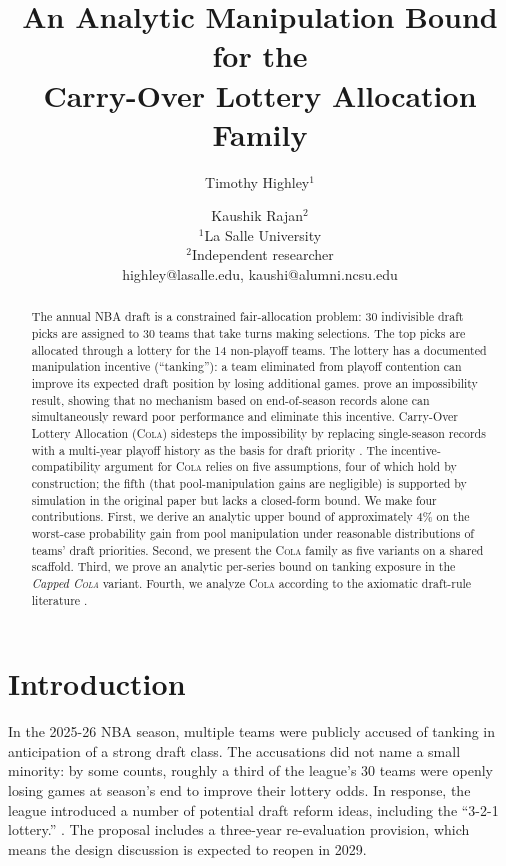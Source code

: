 \documentclass{article}
\title{An Analytic Manipulation Bound for the\\Carry-Over Lottery Allocation Family}
\author{
Timothy Highley$^1$
\and
Kaushik Rajan$^2$
\\
\affiliations
$^1$La Salle University \\
$^2$Independent researcher \\
\emails
highley@lasalle.edu, kaushi@alumni.ncsu.edu
}
\newcommand{\cola}{\textup{\textsc{Cola}}}
\begin{document}
\maketitle

\begin{abstract}
The annual NBA draft is a constrained fair-allocation problem: 30 indivisible draft picks are assigned to 30 teams that take turns making selections. The top picks are allocated through a lottery for the 14 non-playoff teams. The lottery has a documented manipulation incentive (``tanking''): a team eliminated from playoff contention can improve its expected draft position by losing additional games. \citet{munro2020notanking} prove an impossibility result, showing that no mechanism based on end-of-season records alone can simultaneously reward poor performance and eliminate this incentive. Carry-Over Lottery Allocation (\cola{}) sidesteps the impossibility by replacing single-season records with a multi-year playoff history as the basis for draft priority \citep{highley2026cola}. The incentive-compatibility argument for \cola{} relies on five assumptions, four of which hold by construction; the fifth (that pool-manipulation gains are negligible) is supported by simulation in the original paper but lacks a closed-form bound. We make four contributions. First, we derive an analytic upper bound of approximately $4\%$ on the worst-case probability gain from pool manipulation under reasonable distributions of teams' draft priorities. Second, we present the \cola{} family as five variants on a shared scaffold. Third, we prove an analytic per-series bound on tanking exposure in the \emph{Capped \cola{}} variant. Fourth, we analyze \cola{} according to the axiomatic draft-rule literature \citep{coreno2022axiomatic}.
\end{abstract}

\section{Introduction}

In the 2025-26 NBA season, multiple teams were publicly accused of tanking in anticipation of a strong draft class. The accusations did not name a small minority: by some counts, roughly a third of the league's 30 teams were openly losing games at season's end to improve their lottery odds. In response, the league introduced a number of potential draft reform ideas, including the ``3-2-1 lottery.'' \citep{highley2026solvable5}. The proposal includes a three-year re-evaluation provision, which means the design discussion is expected to reopen in 2029.
\end{document}
